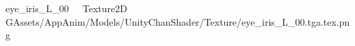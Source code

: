 
   eye_iris_L_00            	   Texture2D
   G   Assets/AppAnim/Models/UnityChanShader/Texture/eye_iris_L_00.tga.tex.png